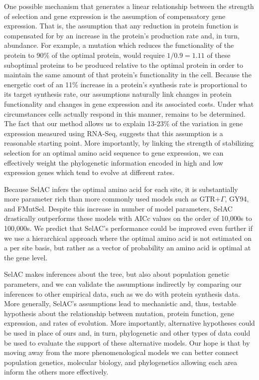 \documentclass[12pt,letterpaper,fleqn]{article}
\newcommand{\selac}{SelAC\xspace}
\begin{document}
One possible mechanism that generates a linear relationship between the strength of selection and gene expression is the assumption of compensatory gene expression.
That is, the assumption that any reduction in protein function is compensated for by an increase in the protein's production rate and, in turn, abundance.
For example, a mutation which reduces the functionality of the protein to 90\% of the optimal protein, would require $1/0.9 = 1.11$ of these suboptimal proteins to be produced relative to the optimal protein in order to maintain the same amount of that protein's functionality in the cell.
Because the energetic cost of an 11\% increase in a protein's synthesis rate is proportional to its target synthesis rate, our assumptions naturally link changes in protein functionality and changes in gene expression and its associated costs.
Under what circumstances cells actually respond in this manner, remains to be determined.
The fact that our method allows us to explain 13-23\% of the variation in gene expression measured using RNA-Seq, suggests that this assumption is a reasonable starting point.
More importantly, by linking the strength of stabilizing selection for an optimal amino acid sequence to gene expression, we can effectively weight the phylogenetic information encoded in high and low expression genes which tend to evolve at different rates.

Because \selac infers the optimal amino acid for each site, it is substantially more parameter rich than more commonly used models such as GTR$+\Gamma$, GY94, and FMutSel.
Despite this increase in number of model parameters, \selac drastically outperforms these models with AICc values on the order of 10,000s to 100,000s.
We predict that \selac's performance could be improved even further if we use a hierarchical approach where the optimal amino acid is not estimated on a per site basis, but rather as a vector of probability an amino acid is optimal at the gene level.

\selac makes inferences about the tree, but also about population genetic parameters, and we can validate the assumptions indirectly by comparing our inferences to other empirical data, such as we do with protein synthesis data.
More generally, \selac's assumptions lead to mechanistic and, thus, testable hypothesis about the relationship between mutation, protein function, gene expression, and rates of evolution.
More importantly, alternative hypotheses could be used in place of ours and, in turn, phylogenetic and other types of data could be used to evaluate the support of these alternative models.
Our hope is that by moving away from the more phenomenological models we can better connect population genetics, molecular biology, and phylogenetics allowing each area inform the others more effectively.
\end{document}
